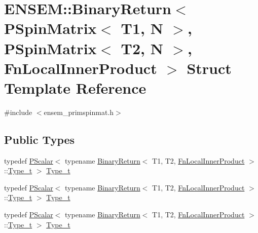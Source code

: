 \hypertarget{structENSEM_1_1BinaryReturn_3_01PSpinMatrix_3_01T1_00_01N_01_4_00_01PSpinMatrix_3_01T2_00_01N_01c4db3884b32cba02d837337f3b77f0f0}{}\section{E\+N\+S\+EM\+:\+:Binary\+Return$<$ P\+Spin\+Matrix$<$ T1, N $>$, P\+Spin\+Matrix$<$ T2, N $>$, Fn\+Local\+Inner\+Product $>$ Struct Template Reference}
\label{structENSEM_1_1BinaryReturn_3_01PSpinMatrix_3_01T1_00_01N_01_4_00_01PSpinMatrix_3_01T2_00_01N_01c4db3884b32cba02d837337f3b77f0f0}


{\ttfamily \#include $<$ensem\+\_\+primspinmat.\+h$>$}

\subsection*{Public Types}
\begin{DoxyCompactItemize}
\item 
typedef \mbox{\hyperlink{classENSEM_1_1PScalar}{P\+Scalar}}$<$ typename \mbox{\hyperlink{structENSEM_1_1BinaryReturn}{Binary\+Return}}$<$ T1, T2, \mbox{\hyperlink{structENSEM_1_1FnLocalInnerProduct}{Fn\+Local\+Inner\+Product}} $>$\+::\mbox{\hyperlink{structENSEM_1_1BinaryReturn_3_01PSpinMatrix_3_01T1_00_01N_01_4_00_01PSpinMatrix_3_01T2_00_01N_01c4db3884b32cba02d837337f3b77f0f0_ac43278b464e4f4a3921f9267c7e2e71d}{Type\+\_\+t}} $>$ \mbox{\hyperlink{structENSEM_1_1BinaryReturn_3_01PSpinMatrix_3_01T1_00_01N_01_4_00_01PSpinMatrix_3_01T2_00_01N_01c4db3884b32cba02d837337f3b77f0f0_ac43278b464e4f4a3921f9267c7e2e71d}{Type\+\_\+t}}
\item 
typedef \mbox{\hyperlink{classENSEM_1_1PScalar}{P\+Scalar}}$<$ typename \mbox{\hyperlink{structENSEM_1_1BinaryReturn}{Binary\+Return}}$<$ T1, T2, \mbox{\hyperlink{structENSEM_1_1FnLocalInnerProduct}{Fn\+Local\+Inner\+Product}} $>$\+::\mbox{\hyperlink{structENSEM_1_1BinaryReturn_3_01PSpinMatrix_3_01T1_00_01N_01_4_00_01PSpinMatrix_3_01T2_00_01N_01c4db3884b32cba02d837337f3b77f0f0_ac43278b464e4f4a3921f9267c7e2e71d}{Type\+\_\+t}} $>$ \mbox{\hyperlink{structENSEM_1_1BinaryReturn_3_01PSpinMatrix_3_01T1_00_01N_01_4_00_01PSpinMatrix_3_01T2_00_01N_01c4db3884b32cba02d837337f3b77f0f0_ac43278b464e4f4a3921f9267c7e2e71d}{Type\+\_\+t}}
\item 
typedef \mbox{\hyperlink{classENSEM_1_1PScalar}{P\+Scalar}}$<$ typename \mbox{\hyperlink{structENSEM_1_1BinaryReturn}{Binary\+Return}}$<$ T1, T2, \mbox{\hyperlink{structENSEM_1_1FnLocalInnerProduct}{Fn\+Local\+Inner\+Product}} $>$\+::\mbox{\hyperlink{structENSEM_1_1BinaryReturn_3_01PSpinMatrix_3_01T1_00_01N_01_4_00_01PSpinMatrix_3_01T2_00_01N_01c4db3884b32cba02d837337f3b77f0f0_ac43278b464e4f4a3921f9267c7e2e71d}{Type\+\_\+t}} $>$ \mbox{\hyperlink{structENSEM_1_1BinaryReturn_3_01PSpinMatrix_3_01T1_00_01N_01_4_00_01PSpinMatrix_3_01T2_00_01N_01c4db3884b32cba02d837337f3b77f0f0_ac43278b464e4f4a3921f9267c7e2e71d}{Type\+\_\+t}}
\end{DoxyCompactItemize}


